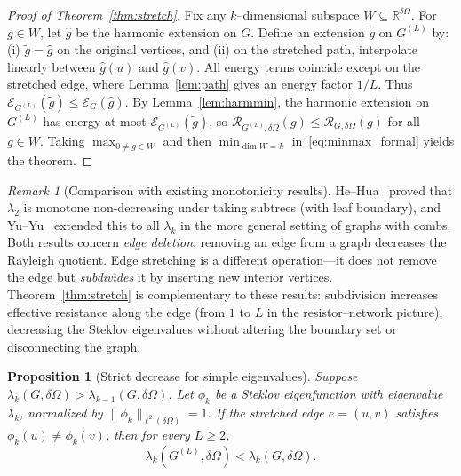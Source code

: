 \documentclass[11pt]{article}
\newtheorem{proposition}[theorem]{Proposition}
\theoremstyle{definition}
\theoremstyle{remark}
\newtheorem{remark}[theorem]{Remark}
\newcommand{\RR}{\mathbb{R}}
\newcommand{\dO}{\delta\Omega}
\begin{document}
\begin{proof}[Proof of Theorem~\ref{thm:stretch}]
Fix any $k$--dimensional subspace $W\subseteq\RR^{\dO}$.
For $g\in W$, let $\widehat{g}$ be the harmonic extension on $G$.
Define an extension $\widetilde{g}$ on $G^{(L)}$ by:
(i) $\widetilde{g}=\widehat{g}$ on the original vertices, and
(ii) on the stretched path, interpolate linearly between $\widehat{g}(u)$ and $\widehat{g}(v)$.
All energy terms coincide except on the stretched edge, where Lemma~\ref{lem:path} gives an energy factor $1/L$.
Thus $\mathcal{E}_{G^{(L)}}(\widetilde{g})\le \mathcal{E}_G(\widehat{g})$.
By Lemma~\ref{lem:harmmin}, the harmonic extension on $G^{(L)}$ has energy at most $\mathcal{E}_{G^{(L)}}(\widetilde{g})$,
so $\mathcal{R}_{G^{(L)},\dO}(g)\le \mathcal{R}_{G,\dO}(g)$ for all $g\in W$.
Taking $\max_{0\neq g\in W}$ and then $\min_{\dim W=k}$ in~\eqref{eq:minmax_formal} yields the theorem.
\end{proof}

\begin{remark}[Comparison with existing monotonicity results]\label{rem:mono_compare}
He--Hua~\cite{HeHua2022Flows} proved that $\lambda_2$ is monotone non-decreasing under taking subtrees (with leaf boundary),
and Yu--Yu~\cite{YuYu2024} extended this to all $\lambda_k$ in the more general setting of graphs with combs.
Both results concern \emph{edge deletion}: removing an edge from a graph decreases the Rayleigh quotient.
Edge stretching is a different operation---it does not remove the edge but \emph{subdivides} it by inserting new interior vertices.
Theorem~\ref{thm:stretch} is complementary to these results: subdivision increases effective resistance along the edge (from $1$ to $L$ in the resistor--network picture), decreasing the Steklov eigenvalues without altering the boundary set or disconnecting the graph.
\end{remark}

\begin{proposition}[Strict decrease for simple eigenvalues]\label{prop:strict}
Suppose $\lambda_k(G,\dO)>\lambda_{k-1}(G,\dO)$.
Let $\phi_k$ be a Steklov eigenfunction with eigenvalue $\lambda_k$, normalized by $\|\phi_k\|_{\ell^2(\dO)}=1$.
If the stretched edge $e=(u,v)$ satisfies $\phi_k(u)\neq\phi_k(v)$, then for every $L\ge 2$,
\[
\lambda_k(G^{(L)},\dO)<\lambda_k(G,\dO).
\]
\end{proposition}
\end{document}

